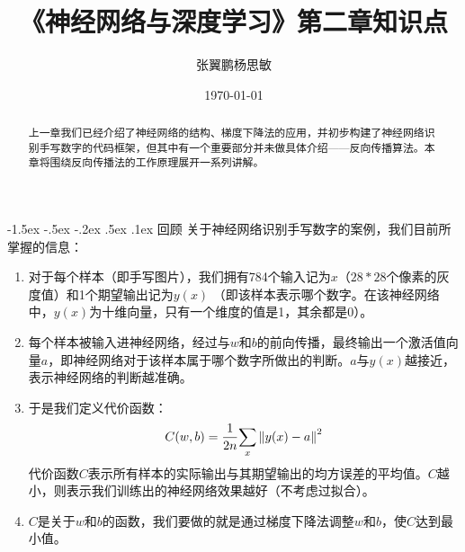 \documentclass[a4paper, 11pt]{article}
\makeatletter
\newcommand{\sihao}{\fontsize{14pt}{\baselineskip}\selectfont}
\renewcommand\section{\@startsection{section}{1}{\z@}%
{-1.5ex \@plus -.5ex \@minus -.2ex}%
{.5ex \@plus .1ex}%
{\normalfont\sihao\CJKfamily{hei}}}
\makeatother
\begin{document}
\begin{CJK*}{GBK}{song}

\newtheorem{example}{例}             %
\newtheorem{algorithm}{算法}
\newtheorem{theorem}{定理}[section]  %
\newtheorem{definition}{定义}
\newtheorem{axiom}{公理}
\newtheorem{property}{性质}
\newtheorem{proposition}{命题}
\newtheorem{lemma}{引理}
\newtheorem{corollary}{推论}
\newtheorem{remark}{注解}
\newtheorem{condition}{条件}
\newtheorem{conclusion}{结论}
\newtheorem{assumption}{假设}

\renewcommand{\contentsname}{目录}  %
\renewcommand{\abstractname}{摘要}  %
\renewcommand{\refname}{参考文献}   %
\renewcommand{\indexname}{索引}
\renewcommand{\figurename}{图}
\renewcommand{\tablename}{表}
\renewcommand{\appendixname}{附录}
\renewcommand{\algorithm}{算法}


\title{《神经网络与深度学习》第二章知识点}
\date{\today}
\author{张翼鹏\quad 杨思敏}


\maketitle
\tableofcontents
\setcounter{section}{-1}
\newpage
\begin{abstract}
上一章我们已经介绍了神经网络的结构、梯度下降法的应用，并初步构建了神经网络识别手写数字的代码框架，但其中有一个重要部分并未做具体介绍——反向传播算法。本章将围绕反向传播法的工作原理展开一系列讲解。
\end{abstract}
\section{回顾}
\indent
关于神经网络识别手写数字的案例，我们目前所掌握的信息：
\begin{enumerate}[leftmargin=35pt]
\renewcommand{\labelenumi}{\theenumi.}
\item 对于每个样本（即手写图片），我们拥有784个输入记为$x$（$28*28$个像素的灰度值）和1个期望输出记为$y(x)$ （即该样本表示哪个数字。在该神经网络中，$y(x)$为十维向量，只有一个维度的值是1，其余都是0）。
\item 每个样本被输入进神经网络，经过与$w$和$b$的前向传播，最终输出一个激活值向量$a$，即神经网络对于该样本属于哪个数字所做出的判断。$a$与$y(x)$越接近，表示神经网络的判断越准确。
\item 于是我们定义代价函数：
$$C(w,b) = {1 \over {2n}}{\sum\limits_x {\left\| {y(x) - a} \right\|} ^2}$$
代价函数$C$表示所有样本的实际输出与其期望输出的均方误差的平均值。$C$越小，则表示我们训练出的神经网络效果越好（不考虑过拟合）。
\item $C$是关于$w$和$b$的函数，我们要做的就是通过梯度下降法调整$w$和$b$，使$C$达到最小值。
\end{enumerate}

\end{CJK*}
\end{document}
